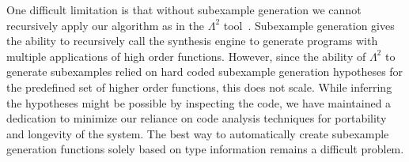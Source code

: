 One difficult limitation is that without subexample generation we cannot recursively apply our algorithm as in the $\Lambda^2$ tool~\cite{Feser:2015}.
Subexample generation gives the ability to recursively call the synthesis engine to generate programs with multiple applications of high order functions.
However, since the ability of $\Lambda^2$ to generate subexamples relied on hard coded subexample generation hypotheses for the predefined set of higher order functions, this does not scale.
While inferring the hypotheses might be possible by inspecting the code, we have maintained a dedication to minimize our reliance on code analysis techniques for portability and longevity of the system.
The best way to automatically create subexample generation functions solely based on type information remains a difficult problem.






